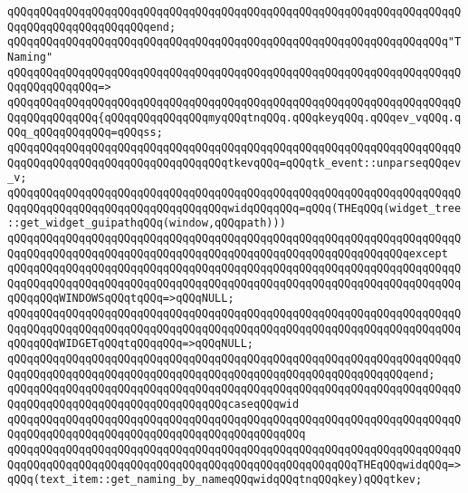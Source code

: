 \verb|qQQqqQQqqQQqqQQqqQQqqQQqqQQqqQQqqQQqqQQqqQQqqQQqqQQqqQQqqQQqqQQqqQQqqQQqqQQqqQQqqQQqqQQqqQQqend;|\newline
\newline
\verb|qQQqqQQqqQQqqQQqqQQqqQQqqQQqqQQqqQQqqQQqqQQqqQQqqQQqqQQqqQQqqQQqqQQq"TNaming"|\newline
\verb|qQQqqQQqqQQqqQQqqQQqqQQqqQQqqQQqqQQqqQQqqQQqqQQqqQQqqQQqqQQqqQQqqQQqqQQqqQQqqQQqqQQq=>|\newline
\verb|qQQqqQQqqQQqqQQqqQQqqQQqqQQqqQQqqQQqqQQqqQQqqQQqqQQqqQQqqQQqqQQqqQQqqQQqqQQqqQQqqQQq{qQQqqQQqqQQqqQQqmyqQQqtnqQQq.qQQqkeyqQQq.qQQqev_vqQQq.qQQq_qQQqqQQqqQQq=qQQqss;|\newline
\verb|qQQqqQQqqQQqqQQqqQQqqQQqqQQqqQQqqQQqqQQqqQQqqQQqqQQqqQQqqQQqqQQqqQQqqQQqqQQqqQQqqQQqqQQqqQQqqQQqqQQqqQQqtkevqQQq=qQQqtk_event::unparseqQQqev_v;|\newline
\newline
\verb|qQQqqQQqqQQqqQQqqQQqqQQqqQQqqQQqqQQqqQQqqQQqqQQqqQQqqQQqqQQqqQQqqQQqqQQqqQQqqQQqqQQqqQQqqQQqqQQqqQQqqQQqwidqQQqqQQq=qQQq(THEqQQq(widget_tree::get_widget_guipathqQQq(window,qQQqpath)))|\newline
\verb|qQQqqQQqqQQqqQQqqQQqqQQqqQQqqQQqqQQqqQQqqQQqqQQqqQQqqQQqqQQqqQQqqQQqqQQqqQQqqQQqqQQqqQQqqQQqqQQqqQQqqQQqqQQqqQQqqQQqqQQqqQQqqQQqqQQqexcept|\newline
\verb|qQQqqQQqqQQqqQQqqQQqqQQqqQQqqQQqqQQqqQQqqQQqqQQqqQQqqQQqqQQqqQQqqQQqqQQqqQQqqQQqqQQqqQQqqQQqqQQqqQQqqQQqqQQqqQQqqQQqqQQqqQQqqQQqqQQqqQQqqQQqqQQqqQQqWINDOWSqQQqtqQQq=>qQQqNULL;|\newline
\verb|qQQqqQQqqQQqqQQqqQQqqQQqqQQqqQQqqQQqqQQqqQQqqQQqqQQqqQQqqQQqqQQqqQQqqQQqqQQqqQQqqQQqqQQqqQQqqQQqqQQqqQQqqQQqqQQqqQQqqQQqqQQqqQQqqQQqqQQqqQQqqQQqqQQqWIDGETqQQqtqQQqqQQq=>qQQqNULL;|\newline
\verb|qQQqqQQqqQQqqQQqqQQqqQQqqQQqqQQqqQQqqQQqqQQqqQQqqQQqqQQqqQQqqQQqqQQqqQQqqQQqqQQqqQQqqQQqqQQqqQQqqQQqqQQqqQQqqQQqqQQqqQQqqQQqqQQqqQQqend;|\newline
\newline
\verb|qQQqqQQqqQQqqQQqqQQqqQQqqQQqqQQqqQQqqQQqqQQqqQQqqQQqqQQqqQQqqQQqqQQqqQQqqQQqqQQqqQQqqQQqqQQqqQQqqQQqqQQqcaseqQQqwid|\newline
\verb|qQQqqQQqqQQqqQQqqQQqqQQqqQQqqQQqqQQqqQQqqQQqqQQqqQQqqQQqqQQqqQQqqQQqqQQqqQQqqQQqqQQqqQQqqQQqqQQqqQQqqQQqqQQqqQQqqQQq|\newline
\verb|qQQqqQQqqQQqqQQqqQQqqQQqqQQqqQQqqQQqqQQqqQQqqQQqqQQqqQQqqQQqqQQqqQQqqQQqqQQqqQQqqQQqqQQqqQQqqQQqqQQqqQQqqQQqqQQqqQQqqQQqqQQqTHEqQQqwidqQQq=>qQQq(text_item::get_naming_by_nameqQQqwidqQQqtnqQQqkey)qQQqtkev;|\newline
